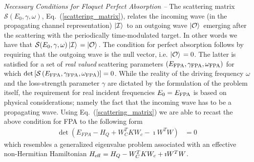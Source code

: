 \documentclass[aps,prl,twocolumn,showpacs,groupedaddress,amsmath,amssymb]{revtex4}
\begin{document}
{\it Necessary Conditions for Floquet Perfect Absorption --} The scattering matrix $\mathcal{S}(E_0,\gamma,\omega)$, 
Eq.~(\ref{scattering_matrix}), relates the incoming wave (in the propagating channel representation) $\left|{\cal I}\rangle\right.$ 
to an outgoing wave $\left|{\cal O}\rangle\right.$ emerging after the scattering with the periodically time-modulated 
target. In other words we have that $ \mathcal{S}(E_0,\gamma,\omega)\left|{\cal I}\rangle\right.=\left|{\cal O}\rangle\right.$. The 
condition for perfect absorption follows by requiring that the outgoing wave is the null vector, i.e. $\left|{\cal O}\rangle\right.=0$. 
The latter is satisfied for a set of {\it real valued} scattering parameters $(E_{\rm FPA},\gamma_{\rm FPA},\omega_{\rm FPA})$ 
for which $\det \left[\mathcal{S}\left(E_{\rm FPA},\gamma_{\rm FPA},\omega_{\rm FPA}\right)\right]=0$. While the reality of the 
driving frequency $\omega$ and the loss-strength parameter $\gamma$ are dictated by the formulation of the problem itself, the 
requirement for real incident frequencies $E_0=E_{\rm FPA}$ is based on physical considerations; namely the fact that the 
incoming wave has to be a propagating wave. Using Eq.~(\ref{scattering_matrix}) we are able to recast the above condition for 
FPA to the following form
\begin{align}
\det\left(E_{FPA}-H_{Q}+W_{C}^{T}KW_{c}-\imath W^{T}W\right) & =0
\label{secular}
\end{align}
which resembles a generalized eigenvalue problem associated with an effective non-Hermitian Hamiltonian $H_{\rm eff}= H_{Q}-W_{C}^{T}
KW_{c}+\imath W^{T}W$. 

\end{document}

